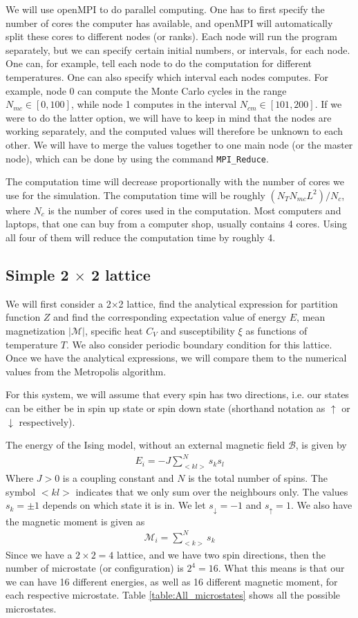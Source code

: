 \documentclass[12pt]{article}
\begin{document}
We will use openMPI to do parallel computing. One has to first specify the number of cores the computer has available, and openMPI will automatically split these cores to different nodes (or ranks). Each node will run the program separately, but we can specify certain initial numbers, or intervals, for each node. One can, for example, tell each node to do the computation for different temperatures. One can also specify which interval each nodes computes. For example, node 0 can compute the Monte Carlo cycles in the range $N_{mc} \in [0,100]$, while node 1 computes in the interval $N_{cm} \in [101, 200]$. If we were to do the latter option, we will have to keep in mind that the nodes are working separately, and the computed values will therefore be unknown to each other. We will have to merge the values together to one main node (or the master node), which can be done by using the command \texttt{MPI\_Reduce}.

The computation time will decrease proportionally with the number of cores we use for the simulation. The computation time will be roughly $(N_TN_{mc}L^2)/N_{c}$, where $N_{c}$ is the number of cores used in the computation. Most computers and laptops, that one can buy from a computer shop, usually contains 4 cores. Using all four of them will reduce the computation time by roughly 4.
\subsection{Simple 2 $\times$ 2 lattice}
We will first consider a 2$\times$2 lattice, find the analytical expression for partition function $Z$ and find the corresponding expectation value of energy $E$, mean magnetization $|\mathcal{M}|$, specific heat $C_V$ and susceptibility $\xi$ as functions of temperature $T$. We also consider periodic boundary condition for this lattice. Once we have the analytical expressions, we will compare them to the numerical values from the Metropolis algorithm.

For this system, we will assume that every spin has two directions, i.e. our states can be either be in spin up state or spin down state (shorthand notation as $\uparrow$ or $\downarrow$ respectively).

The energy of the Ising model, without an external magnetic field $\mathcal{B}$, is given by
\begin{align*}
E_i = \displaystyle -J \sum_{<kl>}^Ns_k s_l
\end{align*} 
Where $J > 0$ is a coupling constant and $N$ is the total number of spins. The symbol $<kl>$ indicates that we only sum over the neighbours only. The values $s_k = \pm 1$ depends on which state it is in. We let $s_{\downarrow} = -1$ and $s_{\uparrow} = 1$. We also have the magnetic moment is given as
\begin{align*}
\mathcal{M}_i = \displaystyle \sum_{<k>}^N s_k
\end{align*}
Since we have a $2\times2=4$ lattice, and we have two spin directions, then the number of microstate (or configuration) is $2^4 = 16$. What this means is that our we can have 16 different energies, as well as 16 different magnetic moment, for each respective microstate. Table \ref{table:All_microstates} shows all the possible microstates.
\end{document}
